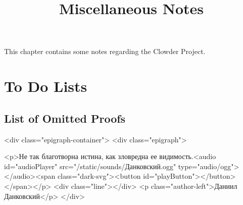 




\title{Miscellaneous Notes}

\maketitle

\label{section-phantom}

This chapter contains some notes regarding the Clowder Project.

\ChapterTableOfContents

\section{To Do Lists}\label{section-to-do-list}
\subsection{List of Omitted Proofs}\label{subsection-proofs-to-add}
<div class="epigraph-container">
  <div class="epigraph">

  <p>Не так благотворна истина, как зловредна ее видимость.<audio id="audioPlayer" src="/static/sounds/Данковский.ogg" type="audio/ogg"></audio><span class="dark-svg"><button id="playButton"></button></span></p>
    <div class="line"></div>
    <p class="author-left">Даниил Данковский</p>
  </div>


